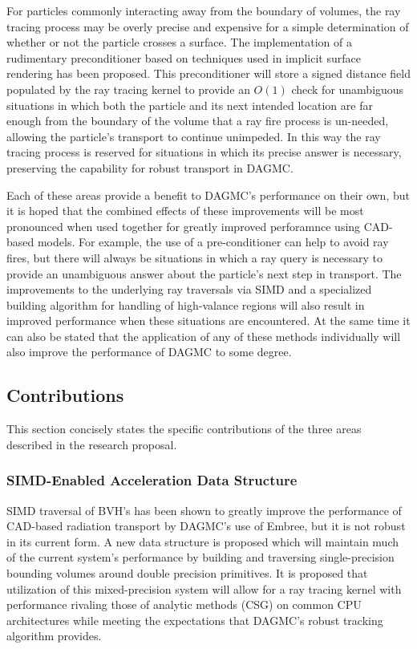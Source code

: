 \documentclass[12pt, a4paper]{article}
\begin{document}
For particles commonly interacting away from the boundary of volumes, the ray tracing process may be overly precise and expensive for a simple determination of whether or not the particle crosses a surface. The implementation of a rudimentary preconditioner based on techniques used in implicit surface rendering has been proposed. This preconditioner will store a signed distance field populated by the ray tracing kernel to provide an $O(1)$ check for unambiguous situations in which both the particle and its next intended location are far enough from the boundary of the volume that a ray fire process is un-needed, allowing the particle's transport to continue unimpeded. In this way the ray tracing process is reserved for situations in which its precise answer is necessary, preserving the capability for robust transport in DAGMC.

Each of these areas provide a benefit to DAGMC's performance on their own, but it is hoped that the combined effects of these improvements will be most pronounced when used together for greatly improved perforamnce using CAD-based models. For example, the use of a pre-conditioner can help to avoid ray fires, but there will always be situations in which a ray query is necessary to provide an unambiguous answer about the particle's next step in transport. The improvements to the underlying ray traversals via SIMD and a specialized building algorithm for handling of high-valance regions will also result in improved performance when these situations are encountered. At the same time it can also be stated that the application of any of these methods individually will also improve the performance of DAGMC to some degree.

\subsection{Contributions}

This section concisely states the specific contributions of the three areas described in the research proposal.

\subsubsection{SIMD-Enabled Acceleration Data Structure}

SIMD traversal of BVH's has been shown to greatly improve the performance of CAD-based radiation transport by DAGMC's use of Embree, but it is not robust in its current form. A new data structure is proposed which will maintain much of the current system's performance by building and traversing single-precision bounding volumes around double precision primitives. It is proposed that utilization of this mixed-precision system will allow for a ray tracing kernel with performance rivaling those of analytic methods (CSG) on common CPU architectures while meeting the expectations that DAGMC's robust tracking algorithm provides.
\end{document}
